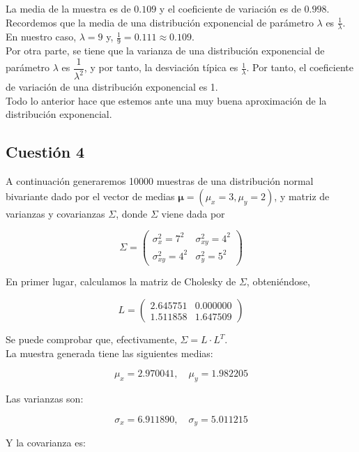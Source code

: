 \documentclass[12pt,a4paper,twoside,openright,titlepage,final]{article}
\begin{document}
La media de la muestra es de $0.109$ y el coeficiente de variación es de $0.998$.\\

Recordemos que la media de una distribución exponencial de parámetro $\lambda$ es $\frac{1}{\lambda}$. En nuestro caso, $\lambda = 9$ y, $\frac{1}{9} = 0.111 \approx 0.109$.\\

Por otra parte, se tiene que la varianza de una distribución exponencial de parámetro $\lambda$ es $\dfrac{1}{\lambda^2}$, y por tanto, la desviación típica es $\frac{1}{\lambda}$. Por tanto, el coeficiente de variación de una distribución exponencial es 1.\\

Todo lo anterior hace que estemos ante una muy buena aproximación de la distribución exponencial. 

\subsection{Cuestión 4}

A continuación generaremos 10000 muestras de una distribución normal bivariante dado por el vector de medias $\mathbf{\mu} = (\mu_x = 3, \mu_y = 2)$, y matriz de varianzas y covarianzas $\Sigma$, donde $\Sigma$ viene dada por

\[ \Sigma = \left( \begin{array}{cc}
\sigma^2_x = 7^2 & \sigma_{xy}^2 = 4^2\\
\sigma_{xy}^2 = 4^2 & \sigma_y^2 = 5^2
\end{array} \right) \]

En primer lugar, calculamos la matriz de Cholesky de $\Sigma$, obteniéndose,

\[ L = \left( \begin{array}{cc}
2.645751 & 0.000000 \\
1.511858 & 1.647509
\end{array} \right) \]

Se puede comprobar que, efectivamente, $\Sigma = L \cdot L^T$.\\

La muestra generada tiene las siguientes medias:

\[\mu_x = 2.970041, \quad \mu_y = 1.982205\]

Las varianzas son:

\[\sigma_x = 6.911890, \quad \sigma_y = 5.011215 \]

Y la covarianza es:
\end{document}
